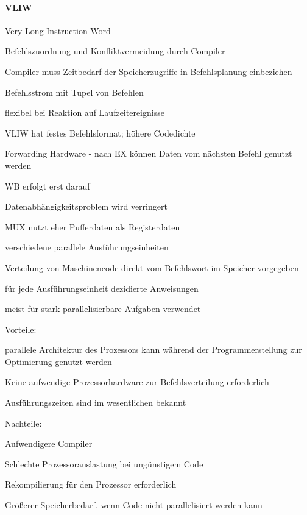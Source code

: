 \documentclass[a4paper]{article}
\begin{document}
\begin{multicols}{3}
  \paragraph{VLIW} Very Long Instruction Word
  \begin{itemize*}
    \item Befehlszuordnung und Konfliktvermeidung durch Compiler
    \item Compiler muss Zeitbedarf der Speicherzugriffe in Befehlsplanung einbeziehen
    \item Befehlsstrom mit Tupel von Befehlen
    \item flexibel bei Reaktion auf Laufzeitereignisse
    \item VLIW hat festes Befehlsformat; höhere Codedichte
    \item Forwarding Hardware - nach EX können Daten vom nächsten Befehl genutzt werden
    \item WB erfolgt erst darauf
    \item Datenabhängigkeitsproblem wird verringert
    \item MUX nutzt eher Pufferdaten als Registerdaten
    \item verschiedene parallele Ausführungseinheiten
    \item Verteilung von Maschinencode direkt vom Befehlswort im Speicher vorgegeben
    \item für jede Ausführungseinheit dezidierte Anweisungen
    \item meist für stark parallelisierbare Aufgaben verwendet
    \item Vorteile:
    \begin{itemize*}
      \item parallele Architektur des Prozessors kann während der Programmerstellung zur Optimierung genutzt werden
      \item Keine aufwendige Prozessorhardware zur Befehlsverteilung erforderlich
      \item Ausführungszeiten sind im wesentlichen bekannt
    \end{itemize*}
    \item Nachteile:
    \begin{itemize*}
      \item Aufwendigere Compiler
      \item Schlechte Prozessorauslastung bei ungünstigem Code
      \item Rekompilierung für den Prozessor erforderlich
      \item Größerer Speicherbedarf, wenn Code nicht parallelisiert werden kann
    \end{itemize*}
  \end{itemize*}
  

\end{multicols}
\end{document}
